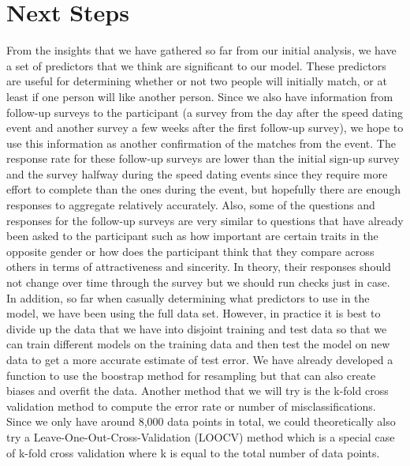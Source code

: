 \documentclass{article}
\begin{document}
\section{Next Steps}
From the insights that we have gathered so far from our initial analysis, we have a set of predictors that we think are significant to our model.  These predictors are useful for determining whether or not two people will initially match, or at least if one person will like another person.  Since we also have information from follow-up surveys to the participant (a survey from the day after the speed dating event and another survey a few weeks after the first follow-up survey), we hope to use this information as another confirmation of the matches from the event.  The response rate for these follow-up surveys are lower than the initial sign-up survey and the survey halfway during the speed dating events since they require more effort to complete than the ones during the event, but hopefully there are enough responses to aggregate relatively accurately.  Also, some of the questions and responses for the follow-up surveys are very similar to questions that have already been asked to the participant such as how important are certain traits in the opposite gender or how does the participant think that they compare across others in terms of attractiveness and sincerity.  In theory, their responses should not change over time through the survey but we should run checks just in case.\\

In addition, so far when casually determining what predictors to use in the model, we have been using the full data set.  However, in practice it is best to divide up the data that we have into disjoint training and test data so that we can train different models on the training data and then test the model on new data to get a more accurate estimate of test error.  We have already developed a function to use the boostrap method for resampling but that can also create biases and overfit the data.  Another method that we will try is the k-fold cross validation method to compute the error rate or number of misclassifications.  Since we only have around 8,000 data points in total, we could theoretically also try a Leave-One-Out-Cross-Validation (LOOCV) method which is a special case of k-fold cross validation where k is equal to the total number of data points.\\
\end{document}
